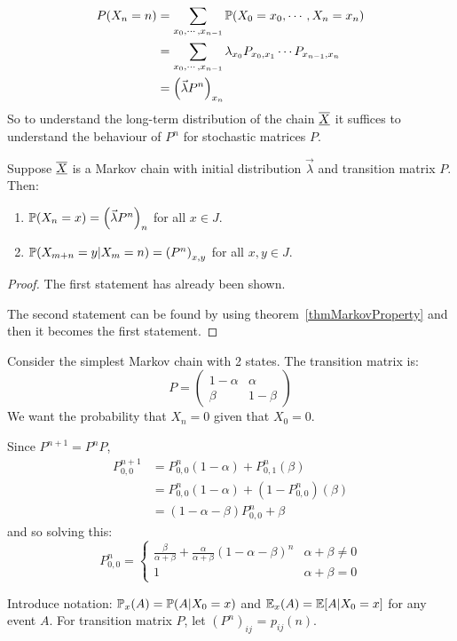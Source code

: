 \documentclass[../Main.tex]{subfiles}
\begin{document}
\begin{align*}
    P(X_n = n) &= \sum_{x_0, \cdots, x_{n - 1}} \P(X_0 = x_0, \cdots, X_n = x_n) \\
    &= \sum_{x_0, \cdots, x_{n-1}} \lambda_{x_0} \Pmat{0}{1} \cdots \Pmat{n-1}{n} \\
    &= \left(\vec{\lambda} P^n\right)_{x_n}
\end{align*}
So to understand the long-term distribution of the chain $\chain{X}$ it suffices to understand the behaviour of $P^n$ for stochastic matrices $P$.

\begin{theorem}
    Suppose $\chain{X}$ is a Markov chain with initial distribution $\vec{\lambda}$ and transition matrix $P$. Then:
    \begin{enumerate}
        \item $\P(X_n = x) = \left(\vec{\lambda} P^n\right)_n$ for all $x \in J$.
        \item $\P(X_{m + n} = y | X_m = n) = \left(P^n\right)_{x, y}$ for all $x, y \in J$.
    \end{enumerate}
    \label{thmMarkovMatPower}
\end{theorem}
\begin{proof}
    The first statement has already been shown.

    The second statement can be found by using theorem~\ref{thmMarkovProperty} and then it becomes the first statement.
\end{proof}
\begin{example}
    Consider the simplest Markov chain with 2 states.
    The transition matrix is:
    \begin{equation*}
        P = 
        \begin{pmatrix}
            1 - \alpha & \alpha \\
            \beta & 1 - \beta
        \end{pmatrix}
    \end{equation*}
    We want the probability that $X_n = 0$ given that $X_0 = 0$.

    Since $P^{n+1} = P^n P$, 
    \begin{align*}
        P_{0, 0}^{n+1} &= P_{0, 0}^n (1 - \alpha) + P_{0, 1}^n (\beta) \\
        &= P_{0, 0}^n (1 - \alpha) + (1 - P_{0, 0}^n) (\beta) \\
        &= (1 - \alpha - \beta) P_{0, 0}^n + \beta
    \end{align*}
    and so solving this:
    \begin{equation*}
        P_{0, 0}^n =
        \begin{cases}
            \frac{\beta}{\alpha + \beta} + \frac{\alpha}{\alpha + \beta} (1 - \alpha - \beta)^n & \alpha + \beta \neq 0 \\
            1 & \alpha + \beta = 0
        \end{cases}
    \end{equation*}
\end{example}
Introduce notation:
$\P_x(A) = \P(A | X_0 = x)$ and $\E_x(A) = \E[A | X_0 = x]$ for any event $A$. For transition matrix $P$, let $(P^n)_{ij}$ = $p_{ij}(n)$.
\end{document}
